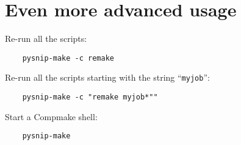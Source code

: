 \documentclass{article}
\begin{document}
\section{Even more advanced usage}

Re-run all the scripts:

\begin{verbatim}
    pysnip-make -c remake
\end{verbatim}

Re-run all the scripts starting with the string ``\texttt{myjob}'':

\begin{verbatim}
    pysnip-make -c "remake myjob*""
\end{verbatim}

Start a Compmake shell:

\begin{verbatim}
    pysnip-make 
\end{verbatim}
\end{document}

